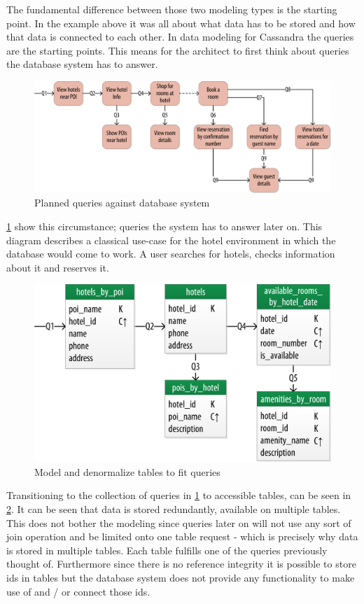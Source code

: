 The fundamental difference between those two modeling types is the starting point. In the example above it was all about what data has to be stored and how that data is connected to each other.
In data modeling for Cassandra the queries are the starting points. This means for the architect to first think about queries the database system has to answer.

\begin{figure}[H]
    \centering
    \includegraphics[width=0.75\columnwidth]{img/model_example_queries_step2.png}
    \caption{Planned queries against database system \autocite{cassandra_oreilly}}
    \label{fig:cassandra:model_data2}
\end{figure}

\ref{fig:cassandra:model_data2} show this circumstance; queries the system has to answer later on. This diagram describes a classical use-case for the hotel environment in which the database would come to work. A user searches for hotels, checks information about it and reserves it.

\begin{figure}[H]
    \centering
    \includegraphics[width=0.75\columnwidth]{img/model_example_chebotko_step3.png}
    \caption{Model and denormalize tables to fit queries \autocite{cassandra_oreilly}}
    \label{fig:cassandra:model_data3}
\end{figure}

Transitioning to the collection of queries in \ref{fig:cassandra:model_data2} to accessible tables, can be seen in \ref{fig:cassandra:model_data3}. It can be seen that data is stored redundantly, available on multiple tables. This does not bother the modeling since queries later on will not use any sort of join operation and be limited onto one table request - which is precisely why data is stored in multiple tables. Each table fulfills one of the queries previously thought of. Furthermore since there is no reference integrity it is possible to store ids in tables but the database system does not provide any functionality to make use of and / or connect those ids.

